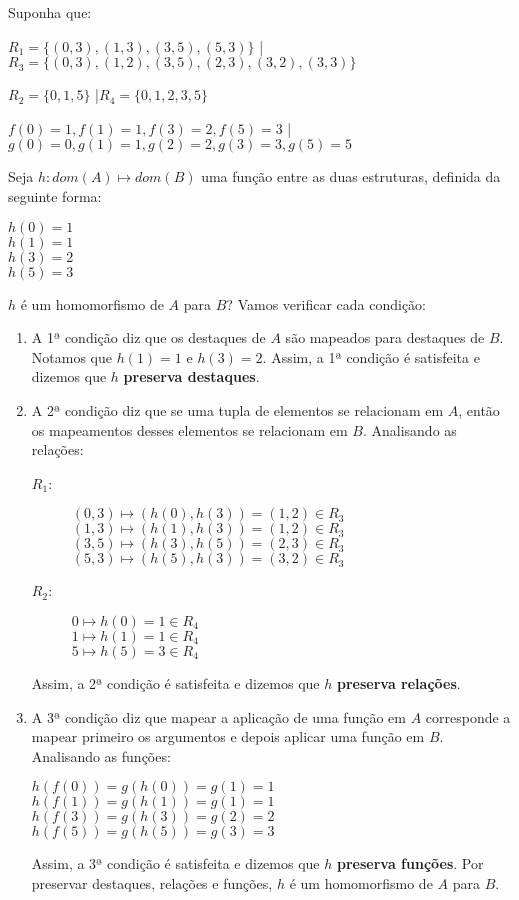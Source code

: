 Suponha que:
\begin{description}
    \item $R_1 = \{(0,3), (1,3), (3,5), (5, 3)\}$ \quad|\quad $R_3 = \{(0,3), (1,2), (3,5), (2, 3), (3,2), (3,3)\}$
    \item $R_2 = \{0,1,5\}$ \quad|\quad $R_4 = \{0,1,2,3,5\}$
    \item $f(0) = 1, f(1) = 1, f(3) = 2, f(5) = 3$ \quad|\quad $g(0) = 0, g(1) = 1, g(2) = 2, g(3) = 3, g(5) = 5$
\end{description}
Seja $h: dom(A) \mapsto dom(B)$ uma função entre as duas estruturas, definida da seguinte forma:
\begin{center}
    $h(0) = 1$ \\
    $h(1) = 1$ \\
    $h(3) = 2$ \\
    $h(5) = 3$
\end{center}
$h$ é um homomorfismo de $A$ para $B$? Vamos verificar cada condição:
\begin{enumerate}
    \item A 1ª condição diz que os destaques de $A$ são mapeados para destaques de $B$. Notamos que $h(1) = 1$ e $h(3) = 2$. Assim, a 1ª condição é satisfeita e dizemos que $h$ \textbf{preserva destaques}.
    \item A 2ª condição diz que se uma tupla de elementos se relacionam em $A$, então os mapeamentos desses elementos se relacionam em $B$. Analisando as relações:
    \begin{description}
        \item[$R_1$:] $(0,3) \mapsto (h(0),h(3)) = (1,2) \in R_3$\\
        $(1,3) \mapsto (h(1),h(3)) = (1,2) \in R_3$ \\
        $(3,5) \mapsto (h(3),h(5)) = (2,3) \in R_3$ \\
        $(5,3) \mapsto (h(5),h(3)) = (3,2) \in R_3$
        \item[$R_2$:] $0 \mapsto h(0) = 1 \in R_4$ \\
        $1 \mapsto h(1) = 1 \in R_4$ \\
        $5 \mapsto h(5) = 3 \in R_4$
    \end{description}
    Assim, a 2ª condição é satisfeita e dizemos que $h$ \textbf{preserva relações}.
    \item A 3ª condição diz que mapear a aplicação de uma função em $A$ corresponde a mapear primeiro os argumentos e depois aplicar uma função em $B$. Analisando as funções:
    \begin{center}
        $h(f(0)) = g(h(0)) = g(1) = 1$ \\
        $h(f(1)) = g(h(1)) = g(1) = 1$ \\
        $h(f(3)) = g(h(3)) = g(2) = 2$ \\
        $h(f(5)) = g(h(5)) = g(3) = 3$
    \end{center}
    Assim, a 3ª condição é satisfeita e dizemos que $h$ \textbf{preserva funções}. Por preservar destaques, relações e funções, $h$ é um homomorfismo de $A$ para $B$.
\end{enumerate}
     
